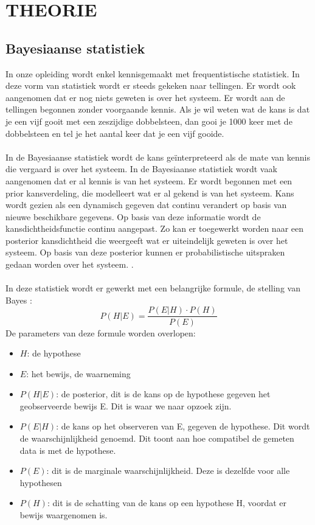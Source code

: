 \section{THEORIE}
\subsection{Bayesiaanse statistiek}
In onze opleiding wordt enkel kennisgemaakt met frequentistische statistiek. In deze vorm van statistiek wordt er steeds gekeken naar tellingen. Er wordt ook aangenomen dat er nog niets geweten is over het systeem. Er wordt aan de tellingen begonnen zonder voorgaande kennis. Als je wil weten wat de kans is dat je een vijf gooit met een zeszijdige dobbelsteen, dan gooi je 1000 keer met de dobbelsteen en tel je het aantal keer dat je een vijf gooide.\\ \\
In de Bayesiaanse statistiek wordt de kans geïnterpreteerd als de mate van kennis die vergaard is over het systeem.
In de Bayesiaanse statistiek wordt vaak aangenomen dat er al kennis is van het systeem. Er wordt begonnen met een prior kansverdeling, die modelleert wat er al gekend is van het systeem. Kans wordt gezien als een dynamisch gegeven dat continu verandert op basis van nieuwe beschikbare gegevens. Op basis van deze informatie wordt de kansdichtheidsfunctie continu aangepast. Zo kan er toegewerkt worden naar een posterior kansdichtheid die weergeeft wat er uiteindelijk geweten is over het systeem. Op basis van deze posterior kunnen er probabilistische uitspraken gedaan worden over het systeem. \cite{walker-2005}.\\ \\
In deze statistiek wordt er gewerkt met een belangrijke formule, de stelling van Bayes \cite{hayes-2024}:
$$P(H|E)=\frac{P(E|H)\cdot P(H)}{P(E)}$$
De parameters van deze formule worden overlopen\cite{unknown-author-2023}:
\begin{itemize}
    \item $H$: de hypothese
    \item $E$: het bewijs, de waarneming
    \item $P(H|E)$: de posterior, dit is de kans op de hypothese gegeven het geobserveerde bewijs E. Dit is waar we naar opzoek zijn.
    \item $P(E|H)$: de kans op het observeren van E, gegeven de hypothese. Dit wordt de waarschijnlijkheid genoemd. Dit toont aan hoe compatibel de gemeten data is met de hypothese. 
    \item $P(E)$: dit is de marginale waarschijnlijkheid. Deze is dezelfde voor alle hypothesen
    \item $P(H)$: dit is de schatting van de kans op een hypothese H, voordat er bewijs waargenomen is. 
\end{itemize}
